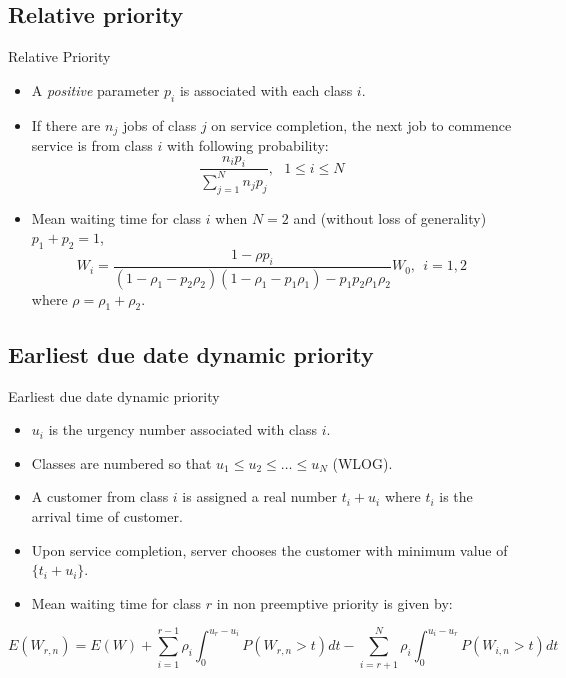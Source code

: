 \documentclass[compress, serif, onlymath, professionalfonts]{beamer}
\begin{document}
\subsection{Relative priority}
\begin{frame}{Relative Priority \citep{RPhaviv} }
\begin{itemize}
\item A \textit{positive} parameter $p_i$ is associated with each class $i$.
\item If there are $n_j$ jobs of class $j$ on service completion, the next job to commence service is from class $i$ with following probability:
\begin{equation}\nonumber
\dfrac{n_i p_i}{\sum_{j=1}^N n_j p_j}, ~~~1 \leq i \leq N
\end{equation}
  \item Mean waiting time for class $i$ when $N = 2$ and (without loss of generality) $p_1 + p_2 = 1$, 
  \begin{equation}\nonumber
  W_i = \dfrac{1-\rho p_i}{(1- \rho_1 - p_2 \rho_2)(1 - \rho_1 - p_1\rho_1)-p_1 p_2 \rho_1\rho_2}W_0, ~~i=1,2
\end{equation}   
  where $\rho = \rho_1 + \rho_2$.%

\end{itemize}
\end{frame}
\subsection{Earliest due date dynamic priority}
\begin{frame}{Earliest due date dynamic priority \citep{EDDgoldberg}}
\begin{itemize}
\item $u_i$ is the urgency number associated with class $i$.
\item Classes are numbered so that $u_1 \leq u_2 \leq \dots \leq u_N$ (WLOG).
\item A customer from class $i$ is assigned a real number $t_i + u_i$ where $t_i$ is the arrival time of customer.
\item Upon service completion, server chooses the customer with minimum value of $\{t_i +u_i\}$.
\item Mean waiting time for class $r$ in non preemptive priority is given by:
\end{itemize}
\begin{equation}\nonumber
E(W_{r,n}) = E(W) + \sum_{i=1}^{r-1}\rho_i\int_{0}^{u_r-u_i}P(W_{r,n} > t)dt - \sum_{i=r+1}^{N}\rho_i\int_{0}^{u_i-u_r}P(W_{i,n} > t)dt 
\end{equation}
\end{frame}
\end{document}
